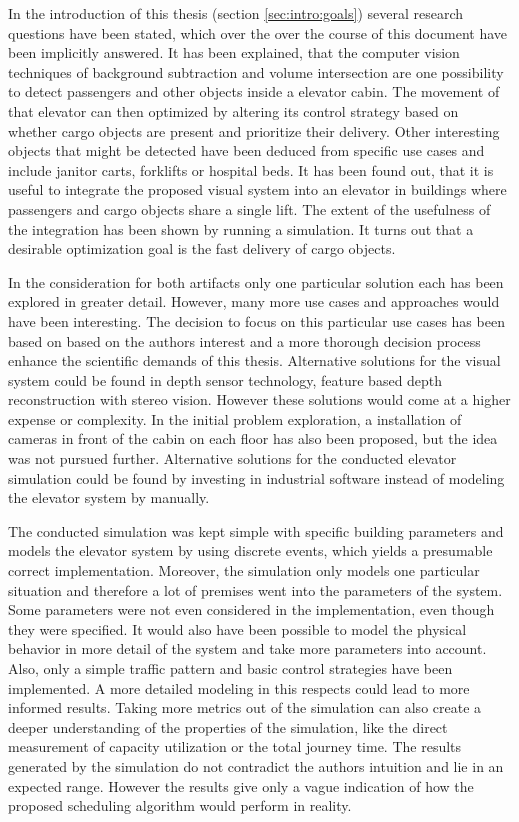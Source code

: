 In the introduction of this thesis (section \ref{sec:intro:goals}) several research questions have been stated,
which over the over the course of this document have been implicitly answered.
It has been explained, that the computer vision techniques of background subtraction and volume intersection are one possibility to detect passengers and other objects inside a elevator cabin. 
The movement of that elevator can then optimized by altering its control strategy based on whether cargo objects are present and prioritize their delivery.
Other interesting objects that might be detected have been deduced from specific use cases and include janitor carts, forklifts or hospital beds.
It has been found out, 
that it  is useful to integrate the proposed visual system into an elevator in buildings where passengers and cargo objects share a single lift.
The extent of the usefulness of the integration has been shown by running a simulation. 
It turns out that a desirable optimization goal is the fast delivery of cargo objects.

In the consideration for both artifacts only one particular solution each has been explored in greater detail.
However, many more use cases and approaches would have been interesting.
The decision to focus on this particular use cases has been based on based on the authors interest and a more thorough decision process enhance the scientific demands of this thesis.
Alternative solutions for the visual system could be found in depth sensor technology, feature based depth reconstruction with stereo vision.
However these solutions would come at a higher expense or complexity.
In the initial problem exploration, a installation of cameras in front of the cabin on each floor has also been proposed, but the idea was not pursued further. 
Alternative solutions for the conducted elevator simulation could be found by investing in industrial software instead of modeling the elevator system by manually. 

The conducted simulation was kept simple with specific building parameters 
and models the elevator system by using discrete events, which yields a presumable correct implementation.
Moreover, the simulation only models one particular situation and therefore a lot of premises went into the parameters of the system.
Some parameters were not even considered in the implementation, even though they were specified.
It would also have been possible to model the physical behavior in more detail of the system and take more parameters into account.
Also, only a simple traffic pattern and basic control strategies have been implemented. 
A more detailed modeling in this respects could lead to more informed results. 
Taking more metrics out of the simulation can also create a deeper understanding of the properties of the simulation, like the direct measurement of capacity utilization or the total journey time.
The results generated by the simulation do not contradict the authors intuition and lie in an expected range. 
However the results give only a vague indication of how the proposed scheduling algorithm would perform in reality.

